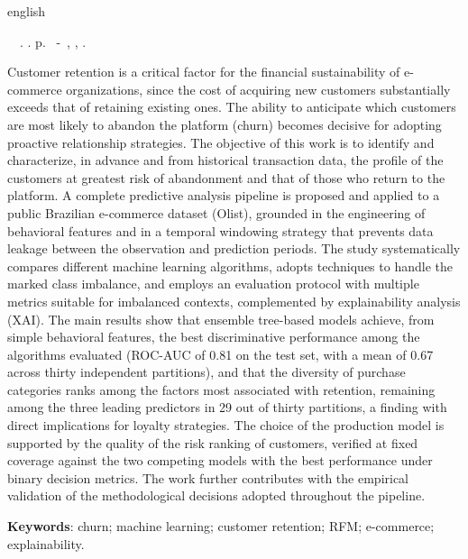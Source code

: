 \begin{resumo}[Abstract]
 \begin{otherlanguage*}{english}
	\begin{flushleft}
		\setlength{\absparsep}{0pt}
		\SingleSpacing
		\imprimirautorabr~~\textbf{\imprimirtitleabstract}.	\imprimirdata.  \pageref{LastPage} p.
		\imprimirtipotrabalhoabs~-~\imprimirinstituicao, \imprimirlocal,	\imprimirdata.
	\end{flushleft}
	\OnehalfSpacing

   Customer retention is a critical factor for the financial sustainability of e-commerce organizations, since the cost of acquiring new customers substantially exceeds that of retaining existing ones. The ability to anticipate which customers are most likely to abandon the platform (churn) becomes decisive for adopting proactive relationship strategies. The objective of this work is to identify and characterize, in advance and from historical transaction data, the profile of the customers at greatest risk of abandonment and that of those who return to the platform. A complete predictive analysis pipeline is proposed and applied to a public Brazilian e-commerce dataset (Olist), grounded in the engineering of behavioral features and in a temporal windowing strategy that prevents data leakage between the observation and prediction periods. The study systematically compares different machine learning algorithms, adopts techniques to handle the marked class imbalance, and employs an evaluation protocol with multiple metrics suitable for imbalanced contexts, complemented by explainability analysis (XAI). The main results show that ensemble tree-based models achieve, from simple behavioral features, the best discriminative performance among the algorithms evaluated (ROC-AUC of 0.81 on the test set, with a mean of 0.67 across thirty independent partitions), and that the diversity of purchase categories ranks among the factors most associated with retention, remaining among the three leading predictors in 29 out of thirty partitions, a finding with direct implications for loyalty strategies. The choice of the production model is supported by the quality of the risk ranking of customers, verified at fixed coverage against the two competing models with the best performance under binary decision metrics. The work further contributes with the empirical validation of the methodological decisions adopted throughout the pipeline.

   \vspace{\onelineskip}

   \noindent
   \textbf{Keywords}: churn; machine learning; customer retention; RFM; e-commerce; explainability.
 \end{otherlanguage*}
\end{resumo}
